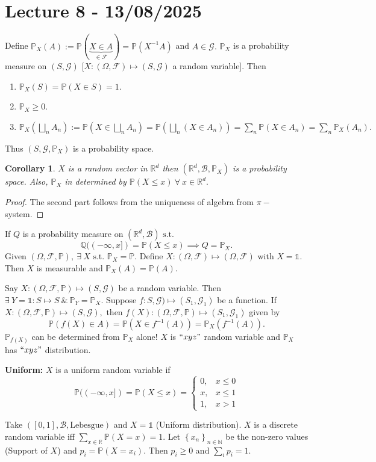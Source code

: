 \documentclass{article}
\newcommand{\1}{\mathds{1}}
\newcommand{\R}{\mathbb{R}}
\newcommand{\Q}{\mathbb{Q}}
\newcommand{\N}{\mathbb{N}}
\newcommand{\F}{\mathcal{F}}
\newcommand{\B}{\mathcal{B}}
\newcommand{\G}{\mathcal{G}}
\newcommand{\PB}{\mathbb{P}}
\newcommand{\lf}{\left}
\newcommand{\rg}{\right}
\newcommand{\en}[3]{\lf\{{#1}_{#2}\rg\}_{#2\in #3}}
\newcommand{\st}{\text{ s.t. }}
\newcommand{\fb}[1]{\lf(#1\rg)}
\newtheorem{corollary}[theorem]{Corollary}
\begin{document}
\section{Lecture 8 - 13/08/2025}
Define $\PB_X(A):=\PB(\underbrace{X\in A}_{\in\F})=\PB(X^{-1}A)$ and $A\in\G.$ $\PB_X$ is a probability measure on $(S,\G)$ [$X:(\Omega,\F)\mapsto (S,\G)$ a random variable]. Then 
\begin{enumerate}
    \item $\PB_X(S)=\PB(X\in S)=1$.
    \item $\PB_X\geq 0.$
    \item $\PB_X\lf(\bigsqcup_n A_n\rg):= \PB\lf(X\in \bigsqcup_n A_n\rg)=\PB\fb{\bigsqcup_n (X\in A_n)}=\sum_n\PB(X\in A_n)=\sum_n\PB_X(A_n).$
\end{enumerate}
Thus $(S,\G,\PB_X)$ is a probability space.
\begin{corollary}
    $X$ is a random vector in $\R^d$ then $(\R^d,\B,\PB_X)$ is a probability space. Also, $\PB_X$ in determined by $\PB(X\leq x)\ \forall\ x\in\R^d.$
\end{corollary}
\begin{proof}
    The second part follows from the uniqueness of algebra from $\pi-$system.
\end{proof}
If $Q$ is a probability measure on $(\R^d,\B)\st$ $$\Q((-\infty,x])=\PB(X\leq x)\implies Q=\PB_X.$$ Given $(\Omega,\F,\PB),\ \exists\ X\st \PB_X=\PB.$ Define $X:(\Omega,\F)\mapsto (\Omega,\F)$ with $X=\1$. Then $X$ is measurable and $\PB_X(A)=\PB(A).$

Say $X:(\Omega,\F,\PB)\mapsto (S,\G)$ be a random variable. Then $\exists\ Y=\1:S\mapsto S\ \&\ \PB_Y=\PB_X.$ Suppose $f:S,\G)\mapsto (S_1,\G_1)$ be a function. If $X:(\Omega,\F,\PB)\mapsto (S,\G),$ then $f(X):(\Omega,\F,\PB)\mapsto (S_1,\G_1)$ given by $$\PB(f(X)\in A)=\PB(X\in f^{-1}(A))=\PB_X(f^{-1}(A)).$$ $\PB_{f(X)}$ can be determined from $\PB_X$ alone! 
$X$ is $``xyz"$ random variable and $\PB_X$ has $``xyz"$ distribution. 

\noindent\textbf{Uniform:} $X$ is a uniform random variable if $$\PB((-\infty,x])=\PB(X\leq x)=\begin{cases}
        0,&x\leq 0\\x,&x\leq 1\\1,&x>1
    \end{cases}$$
    
    Take $([0,1],\B,\text{Lebesgue})$ and $X=\1$ (Uniform distribution). 
    $X$ is a discrete random variable iff $\sum_{x\in\R}\PB(X=x)=1.$ Let $\en xn\N$ be the non-zero values (Support of $X$) and $p_i=\PB(X=x_i).$ Then $p_i\geq 0$ and $\sum_i p_i=1.$
    
\end{document}
